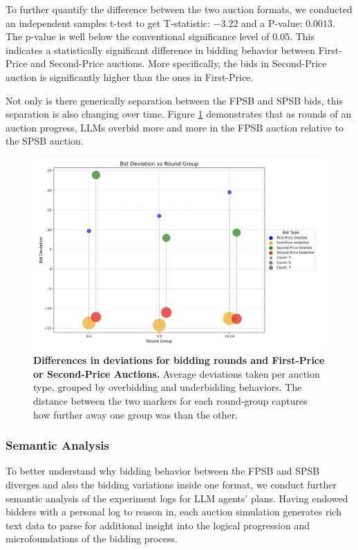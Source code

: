 \documentclass{article} %
\begin{document}
To further quantify the difference between the two auction formats, we conducted an independent samples t-test to get T-statistic: \(-3.22\) and a P-value: \(0.0013\).
The p-value is well below the conventional significance level of 0.05. 
This indicates a statistically significant difference in bidding behavior between First-Price and Second-Price auctions. 
More specifically, the bids in Second-Price auction is significantly higher than the ones in First-Price.

Not only is there generically separation between the FPSB and SPSB bids, this separation is also changing over time. 
Figure \ref{fig:FPSBvsSPSBbyTime} demonstrates that as rounds of an auction progress, LLMs overbid more and more in the FPSB auction relative to the SPSB auction.

\begin{figure}[h!]
    \centering 
    \hspace{2cm}\includegraphics[width=0.75\linewidth]{Figs/FP_SP_round.png}
    \caption{\textbf{ Differences in deviations for bidding rounds and First-Price or Second-Price Auctions.} Average deviations taken per auction type, grouped by overbidding and underbidding behaviors. The distance between the two markers for each round-group captures how further away one group was than the other. }
    \label{fig:FPSBvsSPSBbyTime}
\end{figure}









\subsubsection{Semantic Analysis}

To better understand why bidding behavior between the FPSB and SPSB diverges and also the bidding variations inside one format, we conduct further semantic analysis of the experiment logs for LLM agents' plans. Having endowed bidders with a personal log to reason in, each auction simulation generates rich text data to parse for additional insight into the logical progression and microfoundations of the bidding process.
\end{document}
